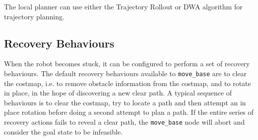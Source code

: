 The local planner can use either the Trajectory Rollout or \ac{DWA} algorithm for trajectory planning.

\subsection{Recovery Behaviours}

When the robot becomes stuck, it can be configured to perform a set of recovery behaviours. The default recovery behaviours available to \texttt{move\_base} are to clear the costmap, i.e. to remove obstacle information from the costmap, and to rotate in place, in the hope of discovering a new clear path. A typical sequence of behaviours is to clear the costmap, try to locate a path and then attempt an in place rotation before doing a second attempt to plan a path. If the entire series of recovery actions fails to reveal a clear path, the \texttt{move\_base} node will abort and consider the goal state to be infeasible\cite{koubaa2016robot}.